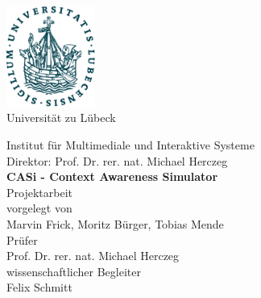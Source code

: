 \documentclass[11pt,    %
  english,ngerman,      %
  paper=a4,             %
  oneside,              %
  tablecaptionbelow,    %
  DIV=calc              %
  ]{scrbook}            %
\begin{document}
\lstset{language=Java}
\frontmatter


\thispagestyle{empty}
\vspace*{-2.2cm}
\begin{center}
  \includegraphics[width=2.9cm]{pics/uni-siegel.pdf}\\

  \vspace{.5cm}
  {
  \fontsize{16pt}{10pt}\selectfont
  Universität zu Lübeck\\
  }

  \vspace{.65cm}
  {
    \fontsize{14pt}{19pt}\selectfont
    Institut für Multimediale und Interaktive Systeme\\
    Direktor: Prof. Dr. rer. nat. Michael Herczeg\\
  }
  \vspace{2.5cm}
  {
    \fontsize{22pt}{22pt}\selectfont
    \bfseries
    CASi - Context Awareness Simulator \\}
  \vspace{1.5cm}
  {
    \fontsize{16pt}{16pt}\selectfont
    Projektarbeit\\
  }
  \vspace{1.5cm}
  {
    \fontsize{13pt}{13pt}\selectfont
    vorgelegt von\\
    \vspace{10pt}
  Marvin Frick, Moritz Bürger, Tobias Mende\\
  }
  \vspace{2.5cm}
  {
    \fontsize{13pt}{13pt}\selectfont
    Prüfer\\
    \vspace{10pt}
    Prof. Dr. rer. nat. Michael Herczeg\\
  }
  \vspace{1.5cm}
  {
    \fontsize{13pt}{13pt}\selectfont
    wissenschaftlicher Begleiter\\
    \vspace{10pt}
    Felix Schmitt
  }
\end{center}
\end{document}
